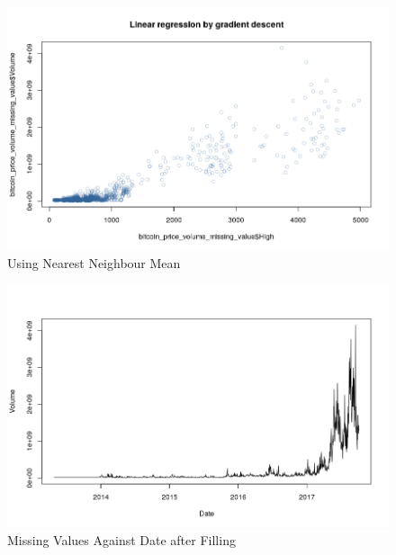 \documentclass{article}
\begin{document}
\newline
 

\begin{figure}
    \centering
    \includegraphics[width=\linewidth]{Volume_After_Filling_Missing_Value.png}
    \caption{Using Nearest Neighbour Mean}
    \label{fig:my_label}
\end{figure}



\begin{figure}
    \centering
    \includegraphics[width=\linewidth]{MissingValue_Against_Date.png}
    \caption{Missing Values Against Date after Filling}
    \label{fig:my_label}
\end{figure}
\end{document}

